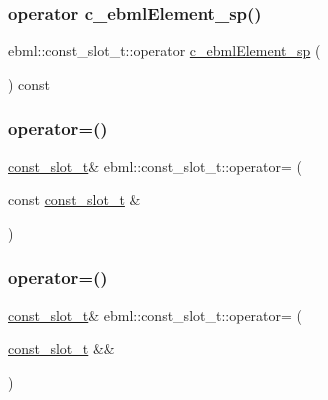 \subsubsection{\texorpdfstring{operator c\+\_\+ebml\+Element\+\_\+sp()}{operator c\_ebmlElement\_sp()}}
{\footnotesize\ttfamily ebml\+::const\+\_\+slot\+\_\+t\+::operator \mbox{\hyperlink{namespaceebml_a2deef4e8071531b32e3533f1bf978917}{c\+\_\+ebml\+Element\+\_\+sp}} (\begin{DoxyParamCaption}{ }\end{DoxyParamCaption}) const}

\mbox{\label{classebml_1_1const__slot__t_a7ef30a5acf5158523b8121bf244d69eb}} 
\subsubsection{\texorpdfstring{operator=()}{operator=()}\hspace{0.1cm}{\footnotesize\ttfamily [1/4]}}
{\footnotesize\ttfamily \mbox{\hyperlink{classebml_1_1const__slot__t}{const\+\_\+slot\+\_\+t}}\& ebml\+::const\+\_\+slot\+\_\+t\+::operator= (\begin{DoxyParamCaption}\item[{const \mbox{\hyperlink{classebml_1_1const__slot__t}{const\+\_\+slot\+\_\+t}} \&}]{ }\end{DoxyParamCaption})}

\mbox{\label{classebml_1_1const__slot__t_af3fa86ec0bd3c82a66341104dda7d5d1}} 
\subsubsection{\texorpdfstring{operator=()}{operator=()}\hspace{0.1cm}{\footnotesize\ttfamily [2/4]}}
{\footnotesize\ttfamily \mbox{\hyperlink{classebml_1_1const__slot__t}{const\+\_\+slot\+\_\+t}}\& ebml\+::const\+\_\+slot\+\_\+t\+::operator= (\begin{DoxyParamCaption}\item[{\mbox{\hyperlink{classebml_1_1const__slot__t}{const\+\_\+slot\+\_\+t}} \&\&}]{ }\end{DoxyParamCaption})}

